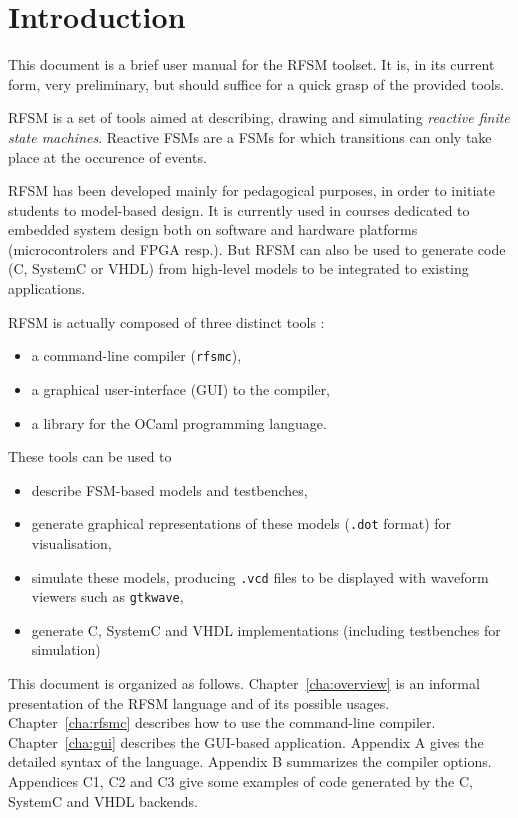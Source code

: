 \chapter{Introduction}
\label{chap:intro}

This document is a brief user manual for the RFSM toolset. It is, in its current form, very
preliminary, but should suffice for a quick grasp of the provided tools. 

\medskip
RFSM is a set of tools aimed at describing, drawing and simulating \emph{reactive finite state
  machines}. Reactive FSMs are a FSMs for which transitions can only take place at the occurence of
events.

\medskip
RFSM has been developed mainly for pedagogical purposes, in order to initiate students to
model-based design. It is currently used in courses dedicated to embedded system design both on
software and hardware platforms (microcontrolers and FPGA resp.). But RFSM can also be used to
generate code (C, SystemC or VHDL) from high-level models to be integrated to existing applications.

\medskip
RFSM is actually composed of three distinct tools :
\begin{itemize}
\item a command-line compiler (\texttt{rfsmc}),
\item a graphical user-interface (GUI) to the compiler, 
\item a library for the OCaml programming language.
\end{itemize}

These tools can be used to
\begin{itemize}
\item describe FSM-based models and testbenches,
\item generate graphical representations of these models (\verb|.dot| format) for visualisation,
\item simulate these models, producing \verb|.vcd| files to be displayed with waveform viewers such
  as \texttt{gtkwave},
\item generate C, SystemC and VHDL implementations (including testbenches for simulation)
\end{itemize}

\medskip
This document is organized as follows.
Chapter~\ref{cha:overview} is an informal presentation of the RFSM language and of its
possible usages. Chapter~\ref{cha:rfsmc} describes how to use the command-line
compiler. Chapter~\ref{cha:gui} describes the GUI-based application. Appendix A 
gives the detailed syntax of the language. Appendix B summarizes the compiler options. Appendices
C1, C2 and C3 give some examples of code generated by the C, SystemC and VHDL backends.

